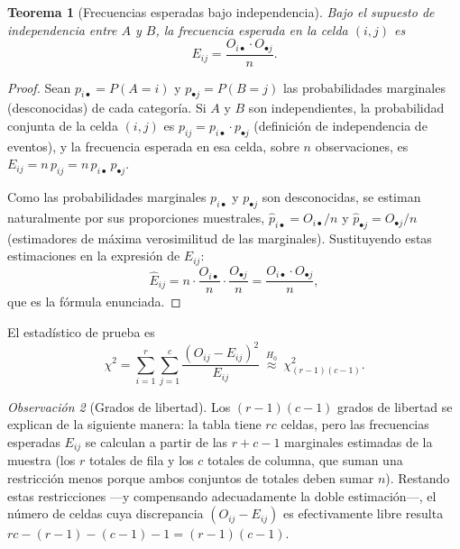 \documentclass[11pt,a4paper]{article}
\theoremstyle{plain}
\newtheorem{teorema}{Teorema}[section]
\theoremstyle{definition}
\theoremstyle{remark}
\newtheorem{observacion}[teorema]{Observación}
\begin{document}
\begin{teorema}[Frecuencias esperadas bajo independencia]
Bajo el supuesto de independencia entre $A$ y $B$, la frecuencia esperada en la celda $(i,j)$ es
\[
E_{ij}=\frac{O_{i\bullet}\cdot O_{\bullet j}}{n}.
\]
\end{teorema}

\begin{proof}
Sean $p_{i\bullet}=P(A=i)$ y $p_{\bullet j}=P(B=j)$ las probabilidades marginales (desconocidas) de cada categoría. Si $A$ y $B$ son independientes, la probabilidad conjunta de la celda $(i,j)$ es $p_{ij}=p_{i\bullet}\cdot p_{\bullet j}$ (definición de independencia de eventos), y la frecuencia esperada en esa celda, sobre $n$ observaciones, es $E_{ij}=n\,p_{ij}=n\,p_{i\bullet}\,p_{\bullet j}$.

Como las probabilidades marginales $p_{i\bullet}$ y $p_{\bullet j}$ son desconocidas, se estiman naturalmente por sus proporciones muestrales, $\hat p_{i\bullet}=O_{i\bullet}/n$ y $\hat p_{\bullet j}=O_{\bullet j}/n$ (estimadores de máxima verosimilitud de las marginales). Sustituyendo estas estimaciones en la expresión de $E_{ij}$:
\[
\widehat E_{ij}=n\cdot\frac{O_{i\bullet}}{n}\cdot\frac{O_{\bullet j}}{n}=\frac{O_{i\bullet}\cdot O_{\bullet j}}{n},
\]
que es la fórmula enunciada.
\end{proof}

El estadístico de prueba es
\[
\chi^2=\sum_{i=1}^r\sum_{j=1}^c \frac{(O_{ij}-E_{ij})^2}{E_{ij}}\ \overset{H_0}{\approx}\ \chi^2_{(r-1)(c-1)}.
\]

\begin{observacion}[Grados de libertad]
Los $(r-1)(c-1)$ grados de libertad se explican de la siguiente manera: la tabla tiene $rc$ celdas, pero las frecuencias esperadas $E_{ij}$ se calculan a partir de las $r+c-1$ marginales estimadas de la muestra (los $r$ totales de fila y los $c$ totales de columna, que suman una restricción menos porque ambos conjuntos de totales deben sumar $n$). Restando estas restricciones —y compensando adecuadamente la doble estimación—, el número de celdas cuya discrepancia $(O_{ij}-E_{ij})$ es efectivamente libre resulta $rc-(r-1)-(c-1)-1=(r-1)(c-1)$.
\end{observacion}
\end{document}
